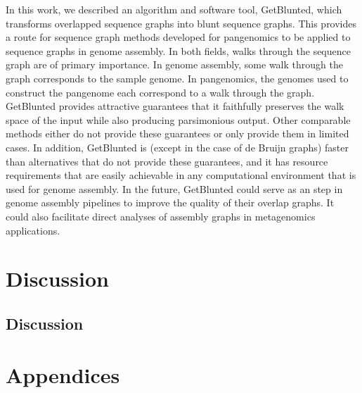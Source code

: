 \documentclass[11pt]{ucthesis}
\begin{document}
In this work, we described an algorithm and software tool, GetBlunted, which transforms overlapped sequence graphs into blunt sequence graphs. 
This provides a route for sequence graph methods developed for pangenomics to be applied to sequence graphs in genome assembly.
In both fields, walks through the sequence graph are of primary importance.
In genome assembly, some walk through the graph corresponds to the sample genome.
In pangenomics, the genomes used to construct the pangenome each correspond to a walk through the graph.
GetBlunted provides attractive guarantees that it faithfully preserves the walk space of the input while also producing parsimonious output.
Other comparable methods either do not provide these guarantees or only provide them in limited cases.
In addition, GetBlunted is (except in the case of de Bruijn graphs) faster than alternatives that do not provide these guarantees, and it has resource requirements that are easily achievable in any computational environment that is used for genome assembly.
In the future, GetBlunted could serve as an step in genome assembly pipelines to improve the quality of their overlap graphs.
It could also facilitate direct analyses of assembly graphs in metagenomics applications.

\part{Discussion}

\chapter{Discussion}
\label{chapter:discussion}


\renewcommand{\figurename}{Supplementary Figure}
\renewcommand{\tablename}{Supplementary Table}

\appendix

\part{Appendices}
\end{document}
